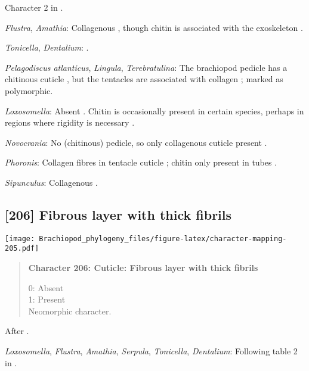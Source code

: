 \documentclass[openany]{book}
\theoremstyle{definition}
\theoremstyle{definition}
\theoremstyle{definition}
\theoremstyle{remark}
\begin{document}
Character 2 in \citet{Haszprunar2008}.

\hypertarget{Amathia-coding-205}{}
\emph{Flustra}, \emph{Amathia}: Collagenous \citep{Schopf1967}, though
chitin is associated with the exoskeleton \citep{Hunt1972}.

\hypertarget{Dentalium-coding-205}{}
\emph{Tonicella}, \emph{Dentalium}: \citet{Haszprunar2008}.

\hypertarget{Lingula-coding-205}{}
\emph{Pelagodiscus atlanticus}, \emph{Lingula}, \emph{Terebratulina}:
The brachiopod pedicle has a chitinous cuticle
\citep{Williams1997Introduction, MacKay1978}, but the tentacles are
associated with collagen \citep{Williams1997Introduction}; marked as
polymorphic.

\hypertarget{Loxosomella-coding-205}{}
\emph{Loxosomella}: Absent \citep{Haszprunar2008}. Chitin is
occasionally present in certain species, perhaps in regions where
rigidity is necessary \citep{Borisanova2015}.

\hypertarget{Novocrania-coding-205}{}
\emph{Novocrania}: No (chitinous) pedicle, so only collagenous cuticle
present \citep{Williams1997Introduction}.

\hypertarget{Phoronis-coding-205}{}
\emph{Phoronis}: Collagen fibres in tentacle cuticle
\citep{Bartolomaeus2001U}; chitin only present in tubes
\citep{Jeuniaux1971}.

\hypertarget{Sipunculus-coding-205}{}
\emph{Sipunculus}: Collagenous \citep{Goffinet1978}.

\subsection*{{[}206{]} Fibrous layer with thick
fibrils}\label{fibrous-layer-with-thick-fibrils}

\texttt{[image: Brachiopod\_phylogeny\_files/figure-latex/character-mapping-205.pdf]}

\begin{quote}
\textbf{Character 206: Cuticle: Fibrous layer with thick fibrils}

0: Absent\\
1: Present\\
Neomorphic character.
\end{quote}

After \citet{Borisanova2015}.

\hypertarget{Amathia-coding-206}{}
\emph{Loxosomella}, \emph{Flustra}, \emph{Amathia}, \emph{Serpula},
\emph{Tonicella}, \emph{Dentalium}: Following table 2 in
\citet{Borisanova2015}.
\end{document}
